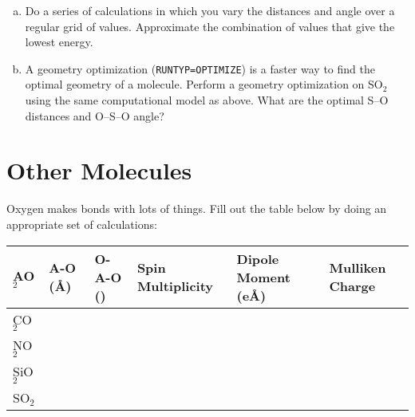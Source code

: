 \documentclass[11pt]{article}
\begin{document}
\begin{enumerate}[(a)]
\item Do a series of calculations in which you vary the  distances and  angle over a regular grid of values. Approximate the combination of values that give the lowest energy.

\item A geometry optimization (\texttt{RUNTYP=OPTIMIZE}) is a faster way to find the optimal geometry of a molecule. Perform a geometry optimization on SO\(_{\text{2}}\) using the same computational model as above. What are the optimal S–O distances and O–S–O angle?
\end{enumerate}

\section{Other Molecules}
\label{sec:org6c352e8}
Oxygen makes bonds with lots of things. Fill out the table below by doing an appropriate set of calculations:

\begin{center}
\begin{tabular}{llllll}
AO\(_{\text{2}}\) & A-O (\AA{}) & O-A-O (\textdegree{}) & Spin Multiplicity & Dipole Moment (e\AA{}) & Mulliken Charge\\
\hline
CO\(_{\text{2}}\) &  &  &  &  & \\
NO\(_{\text{2}}\) &  &  &  &  & \\
SiO\(_{\text{2}}\) &  &  &  &  & \\
SO\(_{\text{2}}\) &  &  &  &  & \\
\end{tabular}
\end{center}
\end{document}
